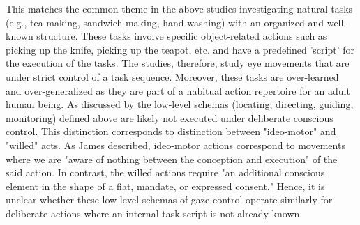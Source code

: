 This matches the common theme in the above studies investigating natural tasks (e.g., tea-making, sandwich-making, hand-washing) with an organized and well-known structure. These tasks involve specific object-related actions such as picking up the knife, picking up the teapot, etc. and have a predefined ’script’ for the execution of the tasks. The studies, therefore, study eye movements that are under strict control of a task sequence. Moreover, these tasks are over-learned and over-generalized as they are part of a habitual action repertoire for an adult human being. As discussed by \citet{Land2006-da} the low-level schemas (locating, directing, guiding, monitoring) defined above are likely not executed under deliberate conscious control. This distinction corresponds to \citet{James2007-zv} distinction between "ideo-motor" and "willed" acts. As James described, ideo-motor actions correspond to movements where we are "aware of nothing between the conception and execution" of the said action. In contrast, the willed actions require "an additional conscious element in the shape of a fiat, mandate, or expressed consent." Hence, it is unclear whether these low-level schemas of gaze control operate similarly for deliberate actions where an internal task script is not already known.

